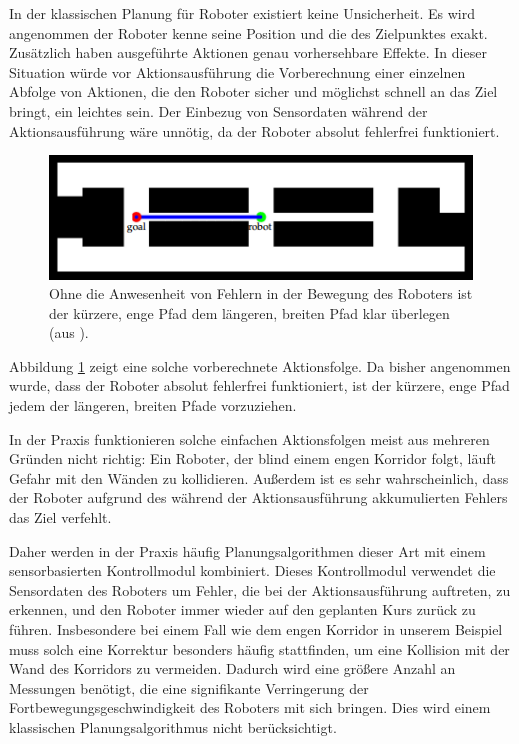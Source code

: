 \documentclass[a4paper]{IEEEtran}
\begin{document}
In der klassischen Planung für Roboter existiert keine Unsicherheit. Es wird angenommen der Roboter kenne seine Position und die des Zielpunktes exakt. Zusätzlich haben ausgeführte Aktionen genau vorhersehbare Effekte. In dieser Situation würde vor Aktionsausführung die Vorberechnung einer einzelnen Abfolge von Aktionen, die den Roboter sicher und möglichst schnell an das Ziel bringt, ein leichtes sein. Der Einbezug von Sensordaten während der Aktionsausführung wäre unnötig, da der Roboter absolut fehlerfrei funktioniert.

\begin{figure}[ht]
	\centering
	\includegraphics[scale=0.72]{images/autnmRobot_directPath.png}
	\caption{Ohne die Anwesenheit von Fehlern in der Bewegung des Roboters ist der kürzere, enge Pfad dem längeren, breiten Pfad klar überlegen (aus \cite{thrun2005probabilistic}).}
	\label{fig:autnmRob_dirPath}
\end{figure}

Abbildung \ref{fig:autnmRob_dirPath} zeigt eine solche vorberechnete Aktionsfolge. Da bisher angenommen wurde, dass der Roboter absolut fehlerfrei funktioniert, ist der kürzere, enge Pfad jedem der längeren, breiten Pfade vorzuziehen.

In der Praxis funktionieren solche einfachen Aktionsfolgen meist aus mehreren Gründen nicht richtig: Ein Roboter, der blind einem engen Korridor folgt, läuft Gefahr mit den Wänden zu kollidieren. Außerdem ist es sehr wahrscheinlich, dass der Roboter aufgrund des während der Aktionsausführung akkumulierten Fehlers das Ziel verfehlt.

Daher werden in der Praxis häufig Planungsalgorithmen dieser Art mit einem sensorbasierten Kontrollmodul kombiniert. Dieses Kontrollmodul verwendet die Sensordaten des Roboters um Fehler, die bei der Aktionsausführung auftreten, zu erkennen, und den Roboter immer wieder auf den geplanten Kurs zurück zu führen. Insbesondere bei einem Fall wie dem engen Korridor in unserem Beispiel muss solch eine Korrektur besonders häufig stattfinden, um eine Kollision mit der Wand des Korridors zu vermeiden. Dadurch wird eine größere Anzahl an Messungen benötigt, die eine signifikante Verringerung der Fortbewegungsgeschwindigkeit des Roboters mit sich bringen. Dies wird einem klassischen Planungsalgorithmus nicht berücksichtigt.
\end{document}
